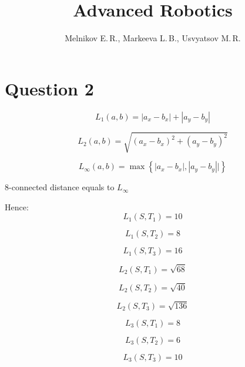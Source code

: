 \documentclass[10pt]{article}
\title{Advanced Robotics}
\author{Melnikov E.\,R., Markeeva L.\,B., Usvyatsov M.\,R.}
\begin{document}
	\maketitle
	\section{Question 2}
		\begin{equation}
			L_1(a, b) = |a_x - b_x| + |a_y - b_y|
		\end{equation}
		
		\begin{equation}
			L_2(a, b) = \sqrt{(a_x - b_x)^2 + (a_y - b_y)^2}
		\end{equation}
		
		\begin{equation}
			L_{\infty} (a, b) = \max \left\{|a_x - b_x|, |a_y- b_y||\right\}
		\end{equation}
		
		8-connected distance equals to $L_{\infty}$ \cite{morse1998lecture}
		
		Hence: 
		\begin{equation}
			L_1(S, T_1) = 10
		\end{equation}
		
		\begin{equation}
			L_1(S, T_2) = 8
		\end{equation}
		
		\begin{equation}
			L_1(S, T_3) = 16
		\end{equation}
		
		\begin{equation}
			L_2(S, T_1) = \sqrt{68}
		\end{equation}
		
		\begin{equation}
			L_2(S, T_2) = \sqrt{40}
		\end{equation}
		
		\begin{equation}
			L_2(S, T_3) = \sqrt{136}
		\end{equation}
		
		\begin{equation}
			L_3(S, T_1) = 8
		\end{equation}
		
		\begin{equation}
			L_3(S, T_2) = 6
		\end{equation}
		
		\begin{equation}
			L_3(S, T_3) = 10
		\end{equation}
		
\end{document}
